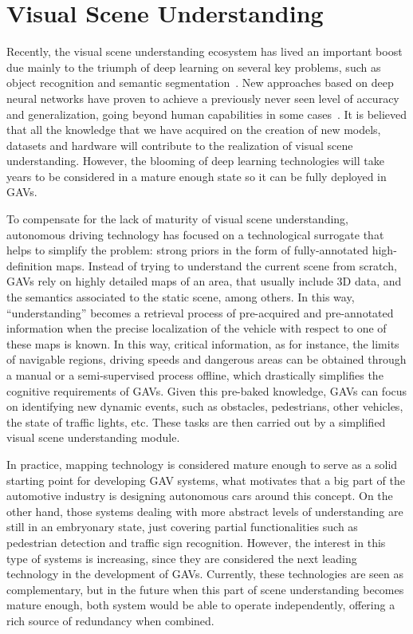 \section{Visual Scene Understanding}

Recently, the visual scene understanding ecosystem has lived an important boost due mainly to the triumph of deep learning on several key problems, such as object recognition and semantic segmentation~\cite{LongICCV15Fully}. New approaches based on deep neural networks have proven to achieve a previously never seen level of accuracy and generalization, going beyond human capabilities in some cases~\cite{HeICCV15Delving}. It is believed that all the knowledge that we have acquired on the creation of new models, datasets and hardware will contribute to the realization of visual scene understanding. However, the blooming of deep learning technologies will take years to be considered in a mature enough state so it can be fully deployed in GAVs.

To compensate for the lack of maturity of visual scene understanding, autonomous driving technology has focused on a technological surrogate that helps to simplify the problem: strong priors in the form of fully-annotated high-definition maps. Instead of trying to understand the current scene from scratch, GAVs rely on highly detailed maps of an area, that usually include 3D data, and the semantics associated to the static scene, among others. In this way, ``understanding'' becomes a retrieval process of pre-acquired and pre-annotated information when the precise localization of the vehicle with respect to one of these maps is known. In this way, critical information, as for instance, the limits of navigable regions, driving speeds and dangerous areas can be obtained through a manual or a semi-supervised process offline, which drastically simplifies the cognitive requirements of GAVs. Given this pre-baked knowledge, GAVs can focus on identifying new dynamic events, such as obstacles, pedestrians, other vehicles, the state of traffic lights, etc. These tasks are then carried out by a simplified visual scene understanding module.

In practice, mapping technology is considered mature enough to serve as a solid starting point for developing GAV systems, what motivates that a big part of the automotive industry is designing autonomous cars around this concept. On the other hand, those systems dealing with more abstract levels of understanding are still in an embryonary state, just covering partial functionalities such as pedestrian detection and traffic sign recognition. However, the interest in this type of systems is increasing, since they are considered the next leading technology in the development of GAVs. Currently, these technologies are seen as complementary, but in the future when this part of scene understanding becomes mature enough, both system would be able to operate independently, offering a rich source of redundancy when combined.     

